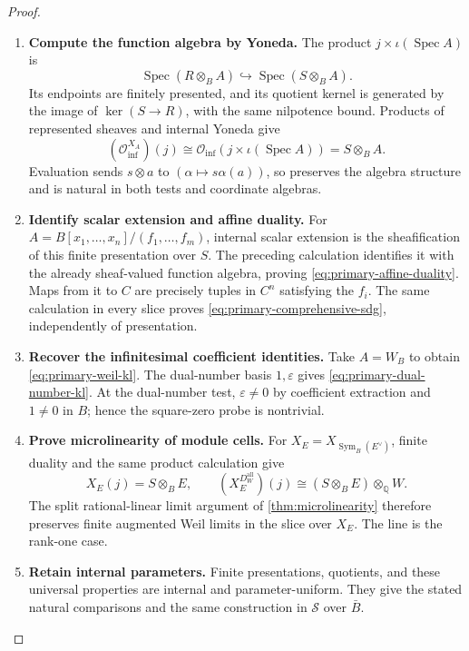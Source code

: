 \documentclass[11pt,a4paper]{article}
\numberwithin{algorithm}{section}
\numberwithin{equation}{section}
\theoremstyle{definition}
\theoremstyle{remark}
\theoremstyle{plain}
\newcommand{\QQ}{\mathbb Q}
\newcommand{\eps}{\varepsilon}
\newcommand{\Sym}{\operatorname{Sym}}
\theoremstyle{definition}
\theoremstyle{plain}
\begin{document}
\begin{proof}\leavevmode
\begin{enumerate}[leftmargin=*,align=left]
\item \textbf{Compute the function algebra by Yoneda.}
The product $j\times\iota(\operatorname{Spec}A)$ is
\[
 \operatorname{Spec}(R\otimes_BA)
 \hookrightarrow\operatorname{Spec}(S\otimes_BA).
\]
Its endpoints are finitely presented, and its quotient kernel is
generated by the image of $\ker(S\to R)$, with the same nilpotence
bound. Products of represented sheaves and internal Yoneda give
\[
 (\mathcal O_{\mathrm{inf}}^{X_A})(j)
 \cong\mathcal O_{\mathrm{inf}}
          (j\times\iota(\operatorname{Spec}A))=S\otimes_BA.
\]
Evaluation sends $s\otimes a$ to $(\alpha\mapsto s\alpha(a))$,
so preserves the algebra structure and is natural in both tests
and coordinate algebras.

\item \textbf{Identify scalar extension and affine duality.}
For $A=B[x_1,\ldots,x_n]/(f_1,\ldots,f_m)$, internal scalar
extension is the sheafification of this finite presentation over $S$.
The preceding calculation identifies it with the already sheaf-valued
function algebra, proving \eqref{eq:primary-affine-duality}.
Maps from it to $C$ are precisely tuples in $C^n$ satisfying
the $f_i$. The same calculation in every slice proves
\eqref{eq:primary-comprehensive-sdg}, independently of presentation.

\item \textbf{Recover the infinitesimal coefficient identities.}
Take $A=W_B$ to obtain \eqref{eq:primary-weil-kl}.
The dual-number basis $1,\eps$ gives
\eqref{eq:primary-dual-number-kl}. At the dual-number test,
$\eps\ne0$ by coefficient extraction and $1\ne0$ in $B$;
hence the square-zero probe is nontrivial.

\item \textbf{Prove microlinearity of module cells.}
For $X_E=X_{\Sym_B(E^\vee)}$, finite duality and the same
product calculation give
\[
 X_E(j)=S\otimes_BE,\qquad
 (X_E^{D_W^{\mathrm{all}}})(j)
       \cong(S\otimes_BE)\otimes_\QQ W.
\]
The split rational-linear limit argument of \cref{thm:microlinearity}
therefore preserves finite augmented Weil limits in the slice over
$X_E$. The line is the rank-one case.

\item \textbf{Retain internal parameters.}
Finite presentations, quotients, and these universal properties
are internal and parameter-uniform. They give the stated natural
comparisons and the same construction in $\mathscr S$ over $\bar B$.
\end{enumerate}
\end{proof}
\end{document}

